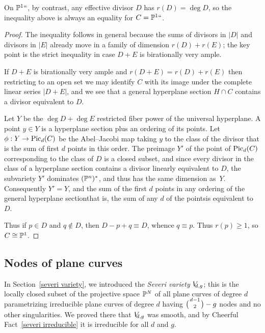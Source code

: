 On $\PP^1` `$, by contrast, any effective divisor $D$ has $r(D) = \deg
D$, so the inequality above is
always an equality for $C = \PP^1` `$.

\begin{proof}
 The inequality follows in general because the sums of divisors in $|D|$
 and divisors in $|E|$ already move in
 a family of dimension $r(D)+r(E)$; the key point is the strict inequality
 in case $D+E$ is birationally very ample.

If $D+E$ is birationally very ample and $r(D+E) = r(D)+r(E)$ then
restricting to an open set
we may identify $C$ with its image under the complete linear series
$|D+E|$, and we see that a general hyperplane section $H\cap C$ contains
a divisor equivalent to $D$.

Let $Y$ be the $\deg D +\deg E$ restricted fiber power of the universal
hyperplane.
A point $y\in Y$ is a hyperplane section plus an ordering of its points.
Let $\phi: Y \to \Pic_d(C)$ be the
Abel--Jacobi map
%
 taking $y$
 to the class of the divisor that is the sum of first $d$ points in this
 order. The preimage  $Y'$ of the point of $\Pic_d(C)$ corresponding to
 the class of $D$ is a closed subset, and
since every divisor in the class of a hyperplane section contains
a divisor
linearly equivalent to  $D$, the subvariety $Y'$ dominates $(\PP^{n})^*$,
and thus
has the same dimension as~$Y$. Consequently $Y'=Y$, and the sum of the
first $d$ points
in any ordering of the general hyperplane section\emdash that is, the
sum of any $d$
of the points\emdash is equivalent to $D$.

Thus if $p\in D$ and $q\notin D$, then $D-p+q \equiv D$, whence $q\equiv
p$. Thus
$r(p)\geq 1$, so $C\cong \PP^1$.
\end{proof}

\subsection*{Nodes of plane curves}

\def\VD#1{V_{\mskip-5mu d,#1}} %

In Section~\ref{severi variety}, we introduced the \emph{Severi variety}
%
$\VD{g}$; this is the locally closed subset of the projective space
$\PP^N$ of all plane curves of degree $d$ parametrizing irreducible
plane curves of degree $d$ having
$\tbinom{d-1}{2} - \nobreak g$
nodes and no other singularities. We proved there that $\VD{g}$ was
smooth, and by Cheerful Fact~\ref{severi irreducible} it is irreducible
for all $d$ and $g$.

